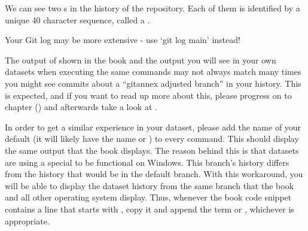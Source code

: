 \sphinxAtStartPar
We can see two {\hyperref[\detokenize{glossary:term-commit}]{}}s in the history of the repository.
Each of them is identified by a unique 40 character sequence, called a
{\hyperref[\detokenize{glossary:term-shasum}]{}}.

\ignorespaces \begin{windowswit}[label={ww-adjustedmode-log}, before title={\thetcbcounter\ }, float, floatplacement=tb, check odd page=true]{Your Git log may be more extensive - use ‘git log main’ instead!}
\label{\detokenize{basics/101-101-create:ww-adjustedmode-log}}

\sphinxAtStartPar
The output of  shown in the book and the output you will see in your own datasets when executing the same commands may not always match \textendash{} many times you might see commits about a “git\sphinxhyphen{}annex adjusted branch” in your history.
This is expected, and if you want to read up more about this, please progress on to chapter {\hyperref[\detokenize{basics/basics-annex:chapter-gitannex}]{}} () and afterwards take a look at .

\sphinxAtStartPar
In order to get a similar experience in your dataset, please add the name of your default {\hyperref[\detokenize{glossary:term-branch}]{}} (it will likely have the name  or ) to every  command.
This should display the same output that the book displays.
The reason behind this is that datasets are using a special {\hyperref[\detokenize{glossary:term-branch}]{}} to be functional on Windows.
This branch’s history differs from the history that would be in the default branch.
With this workaround, you will be able to display the dataset history from the same branch that the book and all other operating system display.
Thus, whenever the book code snippet contains a line that starts with , copy it and append the term  or , whichever is appropriate.


\end{windowswit}

